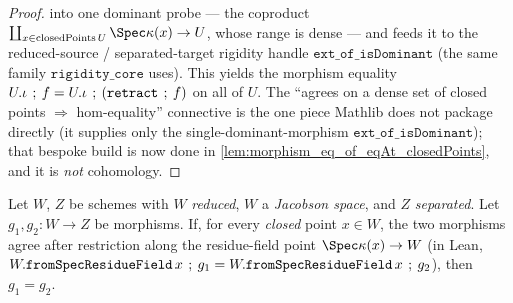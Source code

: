 \begin{proof}
  into one dominant probe --- the coproduct
  \(\coprod_{x \in \mathrm{closedPoints}\,U} \Spec \kappa(x) \to U\), whose range is dense --- and feeds
  it to the reduced-source / separated-target rigidity handle \(\mathtt{ext\_of\_isDominant}\) (the same
  family \(\mathtt{rigidity\_core}\) uses). This yields the morphism equality
  \(U.\iota \fatsemi f = U.\iota \fatsemi (\mathtt{retract} \fatsemi f)\) on all of \(U\). The
  ``agrees on a dense set of closed points \(\Rightarrow\) hom-equality'' connective is the one piece
  Mathlib does not package directly (it supplies only the single-dominant-morphism
  \(\mathtt{ext\_of\_isDominant}\)); that bespoke build is now done in
  \cref{lem:morphism_eq_of_eqAt_closedPoints}, and it is \emph{not} cohomology. \qedhere
\end{proof}
\begin{lemma}
  \label{lem:morphism_eq_of_eqAt_closedPoints}
  
  Let \(W\), \(Z\) be schemes with \(W\) \emph{reduced}, \(W\) a \emph{Jacobson space}, and \(Z\)
  \emph{separated}. Let \(g_1, g_2 \colon W \to Z\) be morphisms. If, for every \emph{closed} point
  \(x \in W\), the two morphisms agree after restriction along the residue-field point
  \(\Spec \kappa(x) \to W\) (in Lean, \(W.\mathtt{fromSpecResidueField}\,x \fatsemi g_1 =
  W.\mathtt{fromSpecResidueField}\,x \fatsemi g_2\)), then \(g_1 = g_2\).
\end{lemma}
